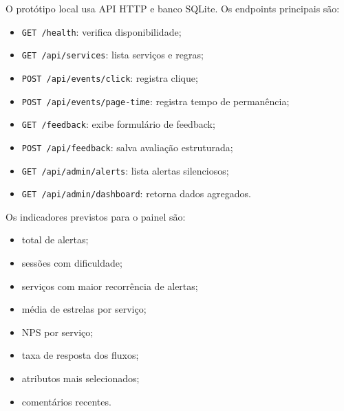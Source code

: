 \begin{apendicesenv}
O protótipo local usa API HTTP e banco SQLite. Os endpoints principais são:

\begin{itemize}
    \item \texttt{GET /health}: verifica disponibilidade;
    \item \texttt{GET /api/services}: lista serviços e regras;
    \item \texttt{POST /api/events/click}: registra clique;
    \item \texttt{POST /api/events/page-time}: registra tempo de permanência;
    \item \texttt{GET /feedback}: exibe formulário de feedback;
    \item \texttt{POST /api/feedback}: salva avaliação estruturada;
    \item \texttt{GET /api/admin/alerts}: lista alertas silenciosos;
    \item \texttt{GET /api/admin/dashboard}: retorna dados agregados.
\end{itemize}

Os indicadores previstos para o painel são:

\begin{itemize}
    \item total de alertas;
    \item sessões com dificuldade;
    \item serviços com maior recorrência de alertas;
    \item média de estrelas por serviço;
    \item NPS por serviço;
    \item taxa de resposta dos fluxos;
    \item atributos mais selecionados;
    \item comentários recentes.
\end{itemize}

\end{apendicesenv}
